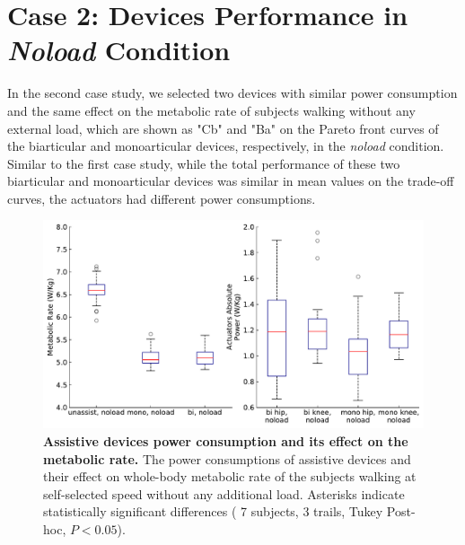 \documentclass[10pt,letterpaper]{article}
\begin{document}
\section*{Case 2: Devices Performance in \textit{\textit{Noload}} Condition}
In the second case study, we selected two devices with similar power consumption and the same effect on the metabolic rate of subjects walking without any external load, which are shown as "Cb" and "Ba" on the Pareto front curves of the biarticular and monoarticular devices, respectively, in the {\it noload} condition. Similar to the first case study, while the total performance of these two biarticular and monoarticular devices was similar in mean values on the trade-off curves, the actuators had different power consumptions.\\
\begin{figure}[ht]   
	\centering
	\includegraphics[width=\linewidth]{Case_Studies/NoloadMono06_NoloadBi12/PaperFigure_BoxPlot.pdf}
	\vspace{1mm}
	\caption{\small{\textbf{Assistive devices power consumption and its effect on the metabolic rate.} The power consumptions of assistive devices and their effect on whole-body metabolic rate of the subjects walking at self-selected speed without any additional load. Asterisks indicate statistically significant differences ( 7 subjects, 3 trails, Tukey Post-hoc, $P < 0.05$).}}
	\label{Fig_Case02_Energy_Plot}
\end{figure}
\end{document}
